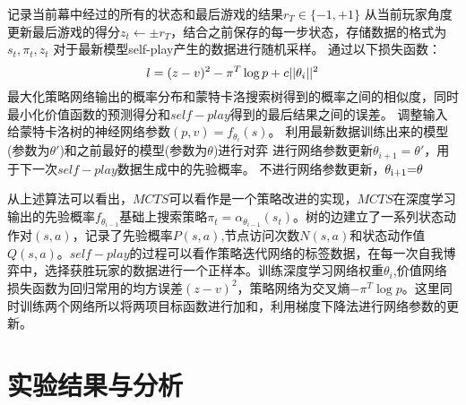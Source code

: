 		\begin{algorithm}[!htbp]
		\begin{algorithmic}[1]
		\State 记录当前幕中经过的所有的状态和最后游戏的结果${r_T} \in \{  - 1, + 1\} $
		\State 从当前玩家角度更新最后游戏的得分${z_t} \leftarrow  \pm {r_T}$，结合之前保存的每一步状态，存储数据的格式为$s_t,\pi_t,z_t$
		\EndFor
		\State 对于最新模型self-play产生的数据进行随机采样。
		\State 通过以下损失函数：
		\begin{equation}
		l = {(z - v)^2} - {\pi ^T}\log p + c||{\theta _i}{\rm{|}}{{\rm{|}}^{\rm{2}}}
		\end{equation}
		最大化策略网络输出的概率分布和蒙特卡洛搜索树得到的概率之间的相似度，同时最小化价值函数的预测得分和$self-play$得到的最后结果之间的误差。
		调整输入给蒙特卡洛树的神经网络参数$(p,v) = {f_{{\theta _i}}}(s)$。
		\State 利用最新数据训练出来的模型(参数为$\theta '$)和之前最好的模型(参数为$\theta$)进行对弈
		 \State 进行网络参数更新${\theta _{i + 1}} = \theta '$，用于下一次$self-play$数据生成中的先验概率。
		\Else
		 \State 不进行网络参数更新，${\theta _{{\rm{i + 1}}}}{\rm{ = }}\theta $
		\EndIf
		\EndIf
		\EndFor
	\end{algorithmic}
\end{algorithm}

从上述算法可以看出，$MCTS$可以看作是一个策略改进的实现，$MCTS$在深度学习输出的先验概率${f_{{\theta _{i - 1}}}}$基础上搜索策略${\pi _t} = {\alpha _{{\theta _{i - 1}}}}({s_t})$。树的边建立了一系列状态动作对$(s,a)$，记录了先验概率$P(s,a)$,节点访问次数$N(s,a)$和状态动作值$Q(s,a)$。$self-play$的过程可以看作策略迭代网络的标签数据，在每一次自我博弈中，选择获胜玩家的数据进行一个正样本。训练深度学习网络权重${\theta _i}$,价值网络损失函数为回归常用的均方误差${(z - v)^2}$，策略网络为交叉熵$ - {\pi ^T}\log p$。这里同时训练两个网络所以将两项目标函数进行加和，利用梯度下降法进行网络参数的更新。

\section{实验结果与分析}

